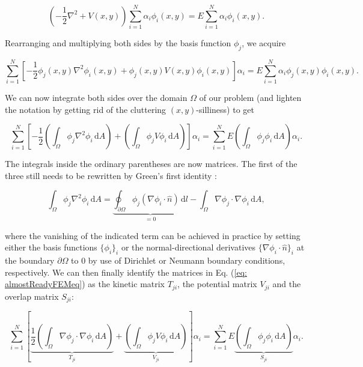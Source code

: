 \documentclass[a4paper,12pt]{article}
\newcommand{\dd}{\,\mathrm{d}}
\begin{document}
\begin{equation}
\label{eq: schrodingerInFEMBasis}
\left( -\frac{1}{2} \nabla^2 + V(x,y) \right) \sum_{i=1}^{N} \alpha_i \phi_i(x,y)  = E \sum_{i=1}^{N} \alpha_i \phi_i(x,y).
\end{equation}

Rearranging and multiplying both sides by the basis function $\phi_j$, we acquire

\begin{equation}
\sum_{i=1}^{N} \left[ -\frac{1}{2} \phi_j(x,y) \nabla^2 \phi_i(x,y) + \phi_j(x,y) V(x,y) \phi_i(x,y) \right]  \alpha_i   = E \sum_{i=1}^{N} \alpha_i \phi_j(x,y) \phi_i(x,y).
\end{equation}

We can now integrate both sides over the domain $\Omega$ of our problem (and lighten the notation by getting rid of the cluttering $(x, y)$-silliness) to get

\begin{equation}
\label{eq: almostReadyFEMeq}
\sum_{i=1}^{N} \left[ -\frac{1}{2} \left( \int_{\Omega} \phi_j \nabla^2 \phi_i \dd A \right) + \left( \int_{\Omega} \phi_j V \phi_i \dd A \right) \right]  \alpha_i   = \sum_{i=1}^{N} E \left( \int_{\Omega} \phi_j \phi_i \dd A \right) \alpha_i .
\end{equation}

The integrals inside the ordinary parentheses are now matrices. The first of the three still needs to be rewritten by Green's first identity \cite{griffiths2}:

\begin{equation}
\int_{\Omega} \phi_j \nabla^2 \phi_i \dd A = \underbrace{\oint_{\partial\Omega} \phi_j (\nabla \phi_i \cdot \hat{n} )\dd l}_{=0} - \int_{\Omega} \nabla \phi_j \cdot \nabla \phi_i \dd A,
\end{equation}

where the vanishing of the indicated term can be achieved in practice by setting either the basis functions $\lbrace\phi_i\rbrace_i$ or the normal-directional derivatives $\lbrace \nabla \phi_i \cdot \hat{n}\rbrace_i$ at the boundary $\partial \Omega$ to 0 by use of Dirichlet or Neumann boundary conditions, respectively. We can then finally identify the matrices in Eq. (\ref{eq: almostReadyFEMeq}) as the kinetic matrix $T_{ji}$, the potential matrix $V_{ji}$ and the overlap matrix $S_{ji}$:

\begin{equation}
\label{eq: readyFEMeq}
\sum_{i=1}^{N} \left[ \underbrace{\frac{1}{2} \left( \int_{\Omega} \nabla \phi_j \cdot \nabla \phi_i \dd A \right)}_{T_{ji}} + \underbrace{\left( \int_{\Omega} \phi_j V \phi_i \dd A \right)}_{V_{ji}} \right]  \alpha_i   = \sum_{i=1}^{N} E \underbrace{\left( \int_{\Omega} \phi_j \phi_i \dd A \right)}_{S_{ji}} \alpha_i .
\end{equation}
\end{document}
